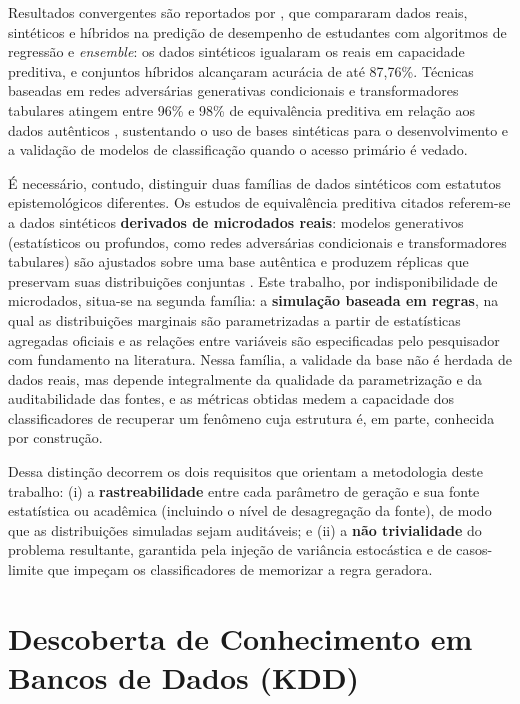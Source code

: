 Resultados convergentes são reportados por , que compararam dados reais, sintéticos e híbridos na predição de desempenho de estudantes com algoritmos de regressão e \textit{ensemble}: os dados sintéticos igualaram os reais em capacidade preditiva, e conjuntos híbridos alcançaram acurácia de até 87,76\%. Técnicas baseadas em redes adversárias generativas condicionais e transformadores tabulares atingem entre 96\% e 98\% de equivalência preditiva em relação aos dados autênticos \cite{kostopoulos2026, shabnam2025}, sustentando o uso de bases sintéticas para o desenvolvimento e a validação de modelos de classificação quando o acesso primário é vedado.

É necessário, contudo, distinguir duas famílias de dados sintéticos com estatutos epistemológicos diferentes. Os estudos de equivalência preditiva citados referem-se a dados sintéticos \textbf{derivados de microdados reais}: modelos generativos (estatísticos ou profundos, como redes adversárias condicionais e transformadores tabulares) são ajustados sobre uma base autêntica e produzem réplicas que preservam suas distribuições conjuntas \cite{kostopoulos2026, shabnam2025}. Este trabalho, por indisponibilidade de microdados, situa-se na segunda família: a \textbf{simulação baseada em regras}, na qual as distribuições marginais são parametrizadas a partir de estatísticas agregadas oficiais e as relações entre variáveis são especificadas pelo pesquisador com fundamento na literatura. Nessa família, a validade da base não é herdada de dados reais, mas depende integralmente da qualidade da parametrização e da auditabilidade das fontes, e as métricas obtidas medem a capacidade dos classificadores de recuperar um fenômeno cuja estrutura é, em parte, conhecida por construção.

Dessa distinção decorrem os dois requisitos que orientam a metodologia deste trabalho: (i) a \textbf{rastreabilidade} entre cada parâmetro de geração e sua fonte estatística ou acadêmica (incluindo o nível de desagregação da fonte), de modo que as distribuições simuladas sejam auditáveis; e (ii) a \textbf{não trivialidade} do problema resultante, garantida pela injeção de variância estocástica e de casos-limite que impeçam os classificadores de memorizar a regra geradora.

\section{Descoberta de Conhecimento em Bancos de Dados (KDD)}

